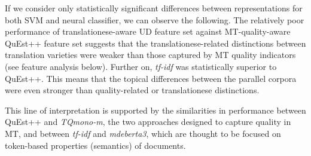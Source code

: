 If we consider only statistically significant differences between representations for both SVM and neural classifier, we can observe the following. 
The relatively poor performance of translationese-aware UD feature set against MT-quality-aware QuEst++ feature set suggests that the translationese-related distinctions between translation varieties were weaker than those captured by MT quality indicators (see feature analysis below).
Further on, \textit{tf-idf} was statistically superior to QuEst++. This means that the topical differences between the parallel corpora were even stronger than quality-related or translationese distinctions.

This line of interpretation is supported by the similarities in performance between QuEst++ and \textit{TQmono-m}, the two approaches designed to capture quality in MT, and between \textit{tf-idf} and \textit{mdeberta3}, which are thought to be focused on token-based properties (semantics) of documents. 


